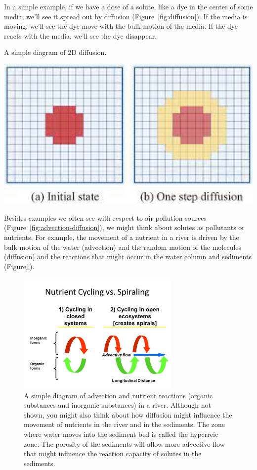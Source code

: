 \documentclass{tufte-handout}\usepackage[]{graphicx}\usepackage[]{xcolor}
\begin{document}
In a simple example, if we have a dose of a solute, like a dye in the center of some media, we'll see it spread out by diffusion (Figure~\ref{fig:diffusion}). If the media is moving, we'll see the dye move with the bulk motion of the media. If the dye reacts with the media, we'll see the dye disappear.

\begin{marginfigure}
\caption{A simple diagram of 2D diffusion.}
\label{fig:diffusion}
\includegraphics[width=1.0\textwidth]{graphics/2D_diffusion.png}
\end{marginfigure}


Besides examples we often see with respect to air pollution sources (Figure~\ref{fig:advection-diffusion}), we might think about solutes as pollutants or nutrients. For example, the movement of a nutrient in a river is driven by the bulk motion of the water (advection) and the random motion of the molecules (diffusion) and the reactions that might occur in the water column and sediments (Figure\ref{fig:nutrientspiraling}).

\begin{figure}[h]
\caption{A simple diagram of advection and nutrient reactions (organic substances and inorganic substances) in a river. Although not shown, you might also think about how diffusion might influence the movement of nutrients in the river and in the sediments.  
The zone where water moves into the sediment bed is called the hyperreic zone. The porosity of the sediments will allow more advective flow that might influence the reaction capacity of solutes in the sediments.}
\label{fig:nutrientspiraling}
\centering
\includegraphics[width=0.7\textwidth]{graphics/NutrientSpiraling.jpg}
\end{figure}
\end{document}
